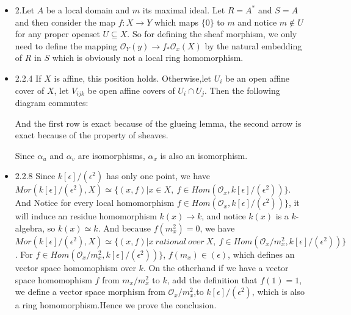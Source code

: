 \documentclass[12pt]{article}
\begin{document}
\begin{itemize}
\item 2.Let $A$ be a local domain and $m$ its maximal ideal. Let $R=A^*$ and $S=A$ and then consider the map $f: X\to Y$ which maps $\{0\}$ to $m$ and notice $m \notin U$ for any proper openset $U\subseteq X$. So for defining the sheaf morphism, we only need to define the mapping $\mathcal{O}_Y(y)\rightarrow f_* \mathcal{O}_x(X)$ by the natural embedding of $R$ in $S$ which is obviously not a local ring homomorphism.
\item 2.2.4 If $X$ is affine, this position holds. Otherwise,let $U_i$ be an open affine cover of $X$, let $V_{ijk}$ be open affine covers of $U_i\cap U_j$. Then the following diagram commutes:
    


And the first row is exact because of the glueing lemma, the second arrow is exact because of the property of sheaves.

Since $\alpha_u$ and $\alpha_v$ are isomorphisms, $\alpha_x$ is also an isomorphism.
\item 2.2.8 Since $k[\epsilon]/(\epsilon^2)$ has only one point, we have $Mor(k[\epsilon]/(\epsilon^2),X) \simeq \{(x,f)| x\in X,\ f\in Hom(\mathcal{O}_x, k[\epsilon]/(\epsilon^2))\}$. And Notice for every local homomorphism $f\in Hom(\mathcal{O}_x, k[\epsilon]/(\epsilon^2))\}$, it will induce an residue homomorphism $k(x)\to k$, and notice $k(x)$ is a $k$-algebra, so $k(x)\simeq k$. And because $f(m_x^2)=0$, we have $Mor(k[\epsilon]/(\epsilon^2),X) \simeq \{(x,f)| x \ rational \ over \  X,\ f\in Hom(\mathcal{O}_x/m_x^2, k[\epsilon]/(\epsilon^2))\}$. For $f\in Hom(\mathcal{O}_x/m_x^2, k[\epsilon]/(\epsilon^2))\}$, $f(m_x)\in (\epsilon)$, which defines an vector space homomophism over $k$. On the otherhand if we have a vector space homomophism $f$ from $m_x/m_x^2$ to $k$, add the definition that $f(1)=1$, we define a vector space morphism from  $\mathcal{O}_x/m_x^2$,to $k[\epsilon]/(\epsilon^2)$, which is also a ring homomorphism.Hence we prove the conclusion.


\end{itemize}
\end{document}
